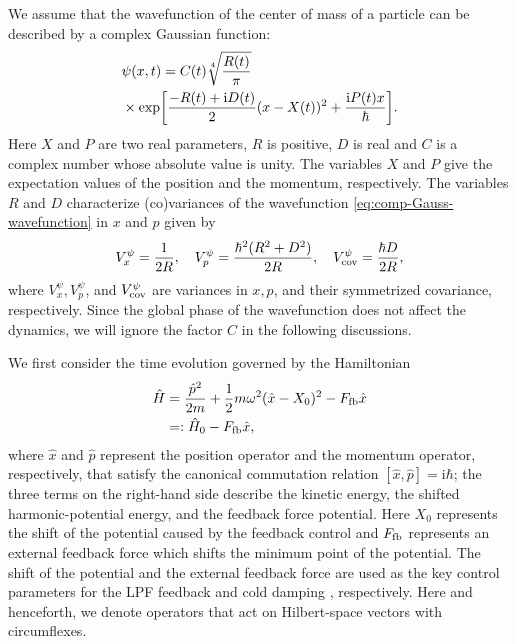 \documentclass[aps,pra,superscriptaddress,twocolumn
]{revtex4-2}
\renewcommand{\i}{\mathrm{i}}
\begin{document}
 We assume that the wavefunction of the center of mass of a particle can be described by a complex Gaussian function:
 \begin{alignat}{1}
   &\psi(x,t) = C(t) \sqrt[4]{\frac{R(t)}{\pi}} \notag \\
  &\times \exp[\frac{-R(t)+\i D(t)}{2}(x-X(t))^2 + \frac{\i P(t) x}{\hbar}].
  \label{eq:comp-Gauss-wavefunction}
 \end{alignat}
 Here $X$ and $P$ are two real parameters, $R$ is positive, $D$ is real and 
 $C$ is a complex number whose absolute value is unity.
 The variables $X$ and $P$ give the expectation values of the position and the momentum, respectively. 
 {The variables $R$ and $D$ characterize (co)variances of 
 the wavefunction \eqref{eq:comp-Gauss-wavefunction}
 in $x$ and $p$ given by 
 \begin{gather}
  V_x^\psi = \frac{1}{2R}, \quad V_p^\psi = \frac{\hbar^2 (R^2 + D^2)}{2R}, \quad V_{\rm cov}^\psi = \frac{\hbar D}{2R},
  \label{eq:covariances-complex-Gaussian-wavefnc}
 \end{gather}
 where $V_x^\psi, V_p^\psi$, and $V_{\rm cov}^\psi$ are variances in $x,p$, and their symmetrized covariance, respectively.}
 Since the global phase of the wavefunction does not affect the dynamics, 
 we will ignore the factor $C$ in the following discussions. 
 
 
 
 
 We first consider the time evolution governed by the Hamiltonian
 \begin{alignat}{1}
  \hat H &= {\frac{\hat p^2}{2m} + \frac{1}{2}m\omega^2 (\hat x-X_0)^2} - F_{\rm fb} \hat x \notag \\
  &=: {\hat H_0} - F_{\rm fb} \hat x,
 \end{alignat}
 {where 
 $\hat x$ and $\hat p$ represent the position operator and the momentum operator, respectively,
 that satisfy the canonical commutation relation $[\hat x, \hat p] = \i\hbar$;}
 the three terms on the right-hand side describe the kinetic energy, 
 the shifted harmonic-potential energy, 
 and the feedback force potential. 
 Here $X_0$ represents the shift of the potential caused by the feedback control 
 and $F_{\rm fb}$ represents an external feedback force
 which shifts the minimum point of the potential.
 The shift of the potential and the external feedback force are used 
 as the key control parameters for the LPF feedback 
 and cold damping \cite{PhysRevLett.96.043003,tebbenjohanns2021quantum,Kamba:22}, respectively.
 Here and henceforth, we denote operators that act on Hilbert-space vectors with circumflexes.
\end{document}
